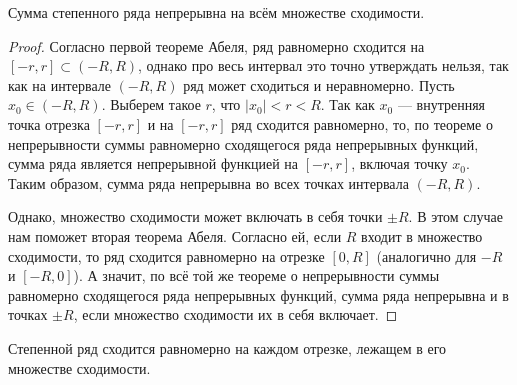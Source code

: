 \documentclass[a4paper, 12pt]{article}
\begin{document}
\begin{Consequence}
Сумма степенного ряда непрерывна на всём множестве сходимости.
\end{Consequence}

\begin{proof}
Согласно первой теореме Абеля, ряд равномерно сходится на $\left [ -r,r \right ] \subset \left ( -R, R \right )$, однако про весь интервал это точно утверждать нельзя, так как на интервале $\left ( -R, R \right )$ ряд может сходиться и неравномерно. Пусть $x_{0}\in\left ( -R, R \right )$. Выберем такое $r$, что $|x_{0}|<r<R$. Так как $x_{0}$ --- внутренняя точка отрезка $\left [ -r, r \right ]$ и на $\left [ -r, r \right ]$ ряд  сходится равномерно, то, по теореме о непрерывности суммы равномерно сходящегося ряда непрерывных функций, сумма ряда является непрерывной функцией на $\left [ -r,r \right ]$, включая точку $x_{0}$.
Таким образом, сумма ряда непрерывна во всех точках интервала $\left ( -R, R \right )$.
 
Однако, множество сходимости может включать в себя точки $\pm R$. В этом случае нам поможет вторая теорема Абеля. Согласно ей, если $R$ входит в множество сходимости, то ряд сходится равномерно на отрезке $[0, R]$ (аналогично для $-R$ и $[-R, 0]$). А значит, по всё той же теореме о непрерывности суммы равномерно сходящегося ряда непрерывных функций, сумма ряда непрерывна и в точках $\pm R$, если множество сходимости их в себя включает.
\end{proof}

\begin{Consequence}
Степенной ряд сходится равномерно на каждом отрезке, лежащем в его множестве сходимости.
\end{Consequence}
\end{document}
